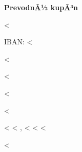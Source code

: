 \documentclass{scrartcl}
\begin{document}
\fontsize{9pt}{10pt}\selectfont

\vspace*{1cm}

\textbf{PrevodnÃ½ kupÃ³n}

\hfill <%

IBAN: <%

<%

\vspace{0.3cm}

<%

<%

<%

<%
<%
\hspace{-1mm}, <%
<%
<%

<%
\end{document}
